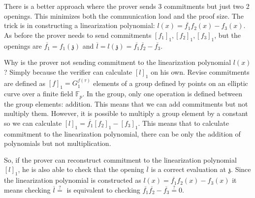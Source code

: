 There is a better approach where the prover sends 3 commitments but just two 2 openings. This minimizes both the communication load and the proof size. The trick is in constructing a linearization polynomial: $l(x) = \overline{f_1} f_2(x) - f_3(x)$. As before the prover needs to send commitments $[f_1]_1, [f_2]_1, [f_3]_1$, but the openings are $\overline{f_1} = f_1(\mathfrak{z})$ and $\overline{l} = l(\mathfrak{z}) = \overline{f_1}\overline{f_2} - \overline{f_3}$.

Why is the prover not sending commitment to the linearization polynomial $l(x)$? Simply because the verifier can calculate $[l]_1$ on his own. Revise commitments are defined as $[f]_1 = G_1^{f(\tau)}$ elements of a group defined by points on an elliptic curve over a finite field $\mathbb{F}_p$. In the group, only one operation is defined between the group elements: addition. This means that we can add commitments but not multiply them. However, it is possible to multiply a group element by a constant so we can calculate $[l]_1 = \overline{f_1}[f_2]_1 - [f_3]_1$. This means that to calculate commitment to the linearization polynomial, there can be only the addition of polynomials but not multiplication. 

So, if the prover can reconstruct commitment to the linearization polynomial $[l]_1$, he is also able to check that the opening $\overline{l}$ is a correct evaluation at $\mathfrak{z}$. Since the linearization polynomial is constructed as $l(x) = \overline{f_1}f_2(x) - f_3(x)$ it means checking $\overline{l} \stackrel{?}{=}$ is equivalent to checking $\overline{f_1}\overline{f_2} - \overline{f_3} \stackrel{?}{=} 0$.



